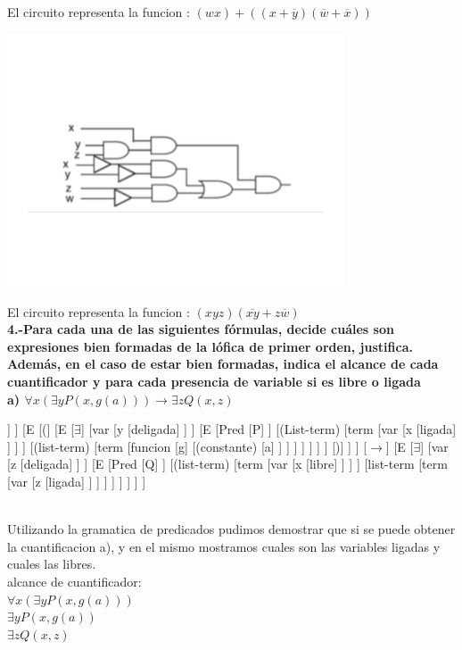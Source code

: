 \documentclass[paper=letter, fontsize=12pt]{scrartcl}
\begin{document}
 El circuito representa la funcion : $(wx)+((x+\overline{y})(\overline{w}+\overline{x}))$\\
 \newpage
 \begin{center}                  
      \includegraphics[width=10cm]{img/circuit2.png}
    \end{center}
     El circuito representa la funcion : $(xyz)(\overline{xy}+z\overline{w})$\\

 \newpage
{\Large{\bf 4.-Para cada una de las siguientes fórmulas, decide cuáles son expresiones bien formadas de la lófica de primer orden, justifica. Además, en el caso de estar bien formadas, indica el alcance de cada cuantificador y para cada presencia de variable si es libre o ligada}}\\
{\bf a) $\forall x (\exists yP(x,g(a))) \rightarrow \exists zQ(x,z)$}\\
\begin{forest}
[E
	[E
		[$\forall$]
		[var
			[x
				[deligada]
			]
		]
		[E
			[(]
			[E
				[$\exists$]
				[var
					[y
						[deligada]
					]
				]
				[E
					[Pred
						[P]
					]
					[(List-term)
						[term
							[var
								[x
									[ligada]
								]
							]
						]
						[(list-term)
							[term
								[funcion
									[g]
									[(constante)
										[a]
									]
								]
							]
						]
					]
				]
			]
			[)]
		]
	]
	[$\rightarrow$]
	[E
	[$\exists$]
	[var
		[z
			[deligada]
		]
	]
	[E
		[Pred
			[Q]
		]
		[(list-term)
			[term
				[var
					[x
						[libre]
					]
				]
			]
			[list-term
				[term
					[var
						[z
							[ligada]
						]
					]
				]
			]
		]
	]
	]
]
\end{forest}\\
Utilizando la gramatica de predicados pudimos demostrar que si se puede obtener la cuantificacion a), y en el mismo mostramos cuales son las variables ligadas y cuales las libres.\\
alcance de cuantificador:\\
$\forall x(\exists yP(x,g(a)))$\\
$\exists yP(x,g(a))$\\
$\exists zQ(x,z)$\\
\end{document}
